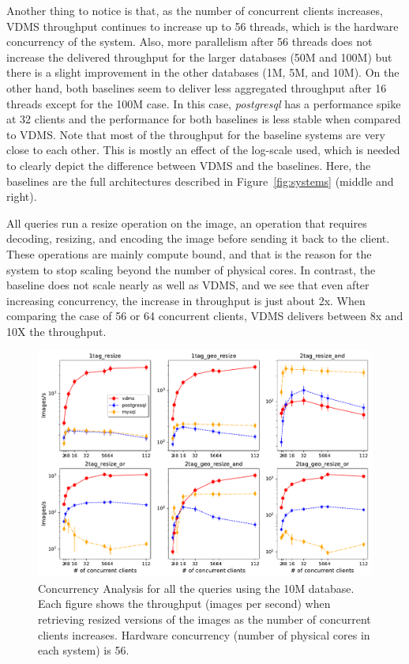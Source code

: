 Another thing to notice is that, as the number of concurrent clients increases,
VDMS throughput continues to increase up to 56 threads, which is
the hardware concurrency of the system.
Also, more parallelism after 56 threads does not increase the delivered throughput
for the larger databases (50M and 100M) but there is a slight improvement in the
other databases (1M, 5M, and 10M).
On the other hand, both baselines seem to deliver less aggregated
throughput after 16 threads except for the 100M case.
In this case, \textit{postgresql} has a performance spike at 32 clients
and the performance for both baselines is less stable when compared
to VDMS.
Note that most of the throughput for the baseline systems are very close to each other.
This is mostly an effect of the log-scale used, which is needed to clearly
depict the difference between VDMS and the baselines.
Here, the baselines are the full architectures described in
Figure~\ref{fig:systems} (middle and right).

All queries run a resize operation on the image,
an operation that requires decoding, resizing, and encoding the image
before sending it back to the client.
These operations are mainly compute bound, and that is the reason for
the system to stop scaling beyond the number of physical cores.
In contrast, the baseline does not scale nearly as well as VDMS,
and we see that even after increasing concurrency, the increase
in throughput is just about 2x.
When comparing the case of 56 or 64 concurrent clients,
VDMS delivers between 8x and 10X the throughput.

\begin{figure}[ht]
\includegraphics[width=\columnwidth]{figures/plot_conc_dbsize_10M_mosaic_results_throughput}
\caption{Concurrency Analysis for all the queries using the 10M database.
Each figure shows the throughput (images per second) when retrieving
resized versions of the images as the number of concurrent clients increases.
Hardware concurrency (number of physical cores in each system)
is 56.}
\label{fig:concurrency_comparison_10M}
\end{figure}

